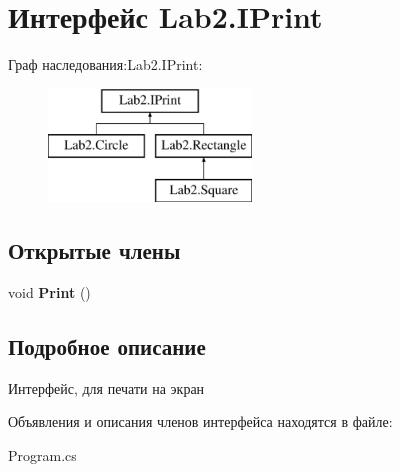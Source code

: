 \hypertarget{interface_lab2_1_1_i_print}{}\section{Интерфейс Lab2.\+I\+Print}
\label{interface_lab2_1_1_i_print}
Граф наследования\+:Lab2.\+I\+Print\+:\begin{figure}[H]
\begin{center}
\leavevmode
\includegraphics[height=3.000000cm]{interface_lab2_1_1_i_print}
\end{center}
\end{figure}
\subsection*{Открытые члены}
\begin{DoxyCompactItemize}
\item 
\mbox{\label{interface_lab2_1_1_i_print_ab2ab78a92b129513c12b26f473d65c31}} 
void {\bfseries Print} ()
\end{DoxyCompactItemize}


\subsection{Подробное описание}
Интерфейс, для печати на экран 

Объявления и описания членов интерфейса находятся в файле\+:\begin{DoxyCompactItemize}
\item 
Program.\+cs\end{DoxyCompactItemize}
